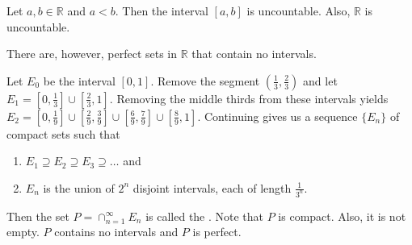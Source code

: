 \documentclass[11pt,letterpaper]{jacky}
\newcommand{\rr}{\mathbb{R}}
\begin{document}
\begin{prop}
  Let $a,b\in\rr$ and $a<b$. Then the interval $[a,b]$ is uncountable. Also,
  $\rr$ is uncountable.
\end{prop}

\begin{note}
  There are, however, perfect sets in $\rr$ that contain no intervals.
\end{note}

\begin{ex}
  Let $E_0$ be the interval $[0,1]$. Remove the segment
  $(\frac{1}{3},\frac{2}{3})$ and let $E_1=[0,\frac{1}{3}]
  \cup[\frac{2}{3},1]$. Removing the middle thirds from these intervals yields
  $E_2=[0,\frac{1}{9}] \cup[\frac{2}{9},\frac{3}{9}]
  \cup[\frac{6}{9},\frac{7}{9}] \cup[\frac{8}{9},1]$. Continuing gives us a
  sequence $\{E_n\}$ of compact sets such that
  \begin{enumerate}
    \item $E_1\supseteq E_2\supseteq E_3\supseteq\ldots$ and
    \item $E_n$ is the union of $2^n$ disjoint intervals, each of length
      $\frac{1}{3^n}$.
  \end{enumerate}
  Then the set $P=\cap_{n=1}^\infty E_n$ is called the .
  Note that $P$ is compact. Also, it is not empty. $P$ contains no intervals
  and $P$ is perfect.
\end{ex}
\end{document}
